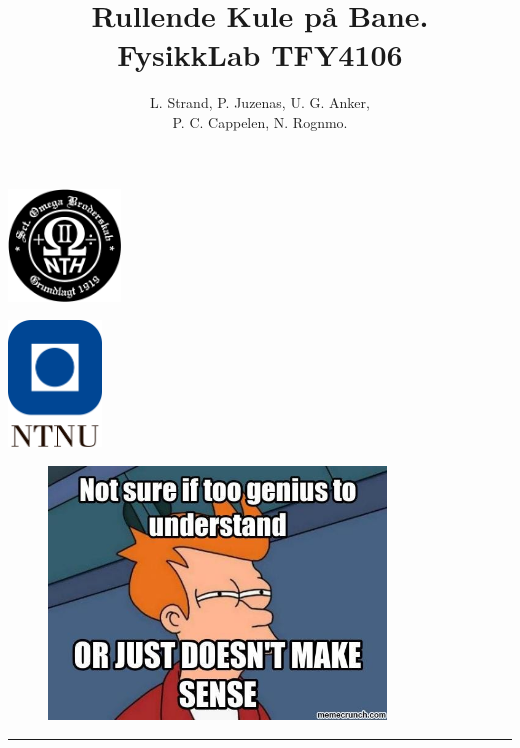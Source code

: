 
\title{%
    \textbf{Rullende Kule på Bane.} \\[3pt]
    \large{FysikkLab TFY4106}}
\author{
    L. Strand,
    P. Juzenas,
    U. G. Anker,    \\[3pt]
    P. C. Cappelen,
    N. Rognmo.}

\begin{minipage}[c]{0.20\textwidth}
    \includegraphics[width=3cm]{Bilder/Omega_logo.png}  
\end{minipage}
\begin{minipage}[c]{0.60\textwidth}

    \maketitle

\end{minipage}
\begin{minipage}[c]{0.20\textwidth}
    \includegraphics[width=2.5cm]{Bilder/NTNU logo.png}  
\end{minipage}


\vfill
\begin{figure}[H]
    \centering
    \includegraphics[width=0.8\textwidth]{Bilder/Futurama_meme.jpg}
\end{figure}



\vfill      %
\setlength{\parskip}{0ex}
\renewcommand{\baselinestretch}{0.1}\normalsize
\tableofcontents
\renewcommand{\baselinestretch}{1.00}\normalsize
\setlength{\parskip}{2ex}
\rule{\textwidth}{1pt}
\newpage


